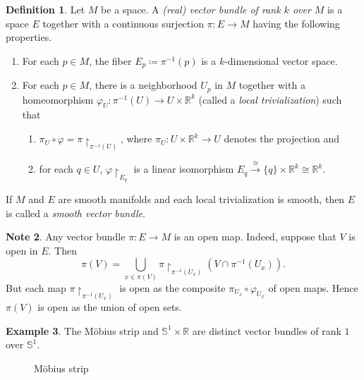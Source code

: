 \documentclass[10pt,letterpaper,cm]{nupset}
\theoremstyle{definition}
\newtheorem{definition}{Definition}[subsection]
\newtheorem{exmp}[definition]{Example}
\newtheorem{note}[definition]{Note}
\theoremstyle{theorem}
\theoremstyle{remark}
\newcommand{\R}{\mathbb R}
\renewcommand{\S}{\mathbb S}
\newcommand{\1}{\mathbf{1}}
\newcommand{\0}{\vec 0}
\begin{document}
\begin{definition}
Let $M$ be a space. A \textit{(real) vector bundle of rank $k$ over $M$} is a space $E$ together with a continuous surjection $\pi : E \to M$ having the following properties.
\begin{enumerate}[label=(\Roman*)]
\item For each $p \in M$, the fiber $E_p\coloneqq  \pi^{-1}(p)$ is a $k$-dimensional vector space.
\item For each $p\in M$, there is a neighborhood $U_p$ in $M$ together with a homeomorphism $\varphi_U :\pi^{-1}(U) \to U \times \R^k$ (called a \textit{local trivialization}) such that
\begin{enumerate}
\item $\pi_U \circ \varphi  = \pi \restriction_{\pi^{-1}(U)}$, where $\pi_U : U \times \R^k \to U$ denotes the projection and
\item for each $q\in U$, $\varphi \restriction_{E_q}$ is a linear isomorphism $E_q \overset{\cong}{\longrightarrow} \{q\} \times \R^k \cong \R^k.$
\end{enumerate}
\end{enumerate}
If $M$ and $E$ are smooth manifolds and each local trivialization  is smooth, then $E$ is called a \textit{smooth vector bundle}.
\end{definition}

\begin{note}
Any vector bundle $\pi : E \to M$ is an open map. Indeed, suppose that $V$ is open in $E$. Then 
\[
\pi(V) = \bigcup_{x \in \pi(V)}\pi\restriction_{\pi^{-1}(U_x)}(V \cap \pi^{-1}(U_x))
.\] But each map $\pi\restriction_{\pi^{-1}(U_x)}$ is open as the composite $\pi_{U_x} \circ \varphi_{U_x}$ of open maps. Hence $\pi(V)$ is open as the union of open sets.
\end{note}

\pagebreak

\begin{exmp}
The M\"obius strip and $\S^1 \times \R$ are distinct vector bundles of rank $1$ over $\S^1$.

\begin{figure}[h]
\centering
{}
\caption{M\"obius strip} 
\end{figure}

\end{exmp}
\end{document}
